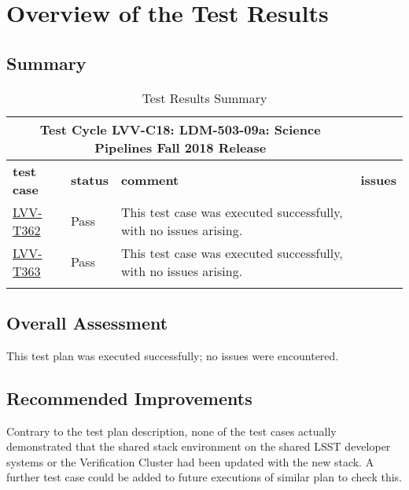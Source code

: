 \documentclass[DM,lsstdraft,STR,toc]{lsstdoc}
\begin{document}
\newpage

\section{Overview of the Test Results}
\label{sect:overview}

\subsection{Summary}
\label{sect:summarytable}

\begin{longtable}{p{}p{}p{}p{}}
\toprule
  \multicolumn{3}{c}{ Test Cycle {\bf LVV-C18: LDM-503-09a: Science Pipelines Fall 2018 Release
 }} \\\hline
  {\bf \footnotesize test case} & {\bf \footnotesize status} & {\bf \footnotesize comment} & {\bf \footnotesize issues} \\\toprule
    \href{https://jira.lsstcorp.org/secure/Tests.jspa#/testCase/LVV-T362}{LVV-T362} 
    & Pass & This test case was executed successfully, with no issues arising.
 &
    \\\hline
    \href{https://jira.lsstcorp.org/secure/Tests.jspa#/testCase/LVV-T363}{LVV-T363} 
    & Pass & This test case was executed successfully, with no issues arising.
 &
    \\\hline

\caption{Test Results Summary}
\label{table:summary}
\end{longtable}

\subsection{Overall Assessment}
\label{sect:overallassessment}

This test plan was executed successfully; no issues were encountered.


\subsection{Recommended Improvements}
\label{sect:recommendations}

Contrary to the test plan description, none of the test cases actually
demonstrated that the shared stack environment on the shared LSST
developer systems or the Verification Cluster had been updated with the
new stack. A further test case could be added to future executions of
similar plan to check this.
\end{document}
